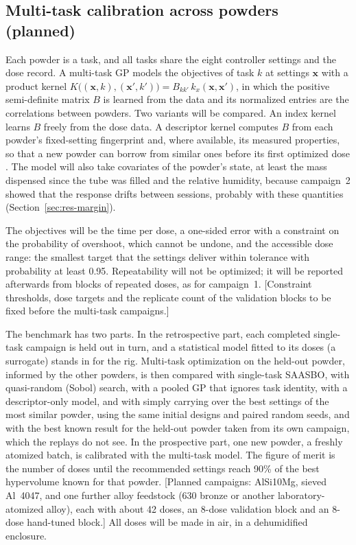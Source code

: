 \documentclass[preprint,12pt]{elsarticle}
\newcommand{\ph}[1]{\textcolor{orange!75!black}{\textsf{[#1]}}}
\begin{document}
\subsection{Multi-task calibration across powders (planned)}
\label{sec:mtbo}

Each powder is a task, and all tasks share the eight controller settings and the dose record. A multi-task GP \cite{Bonilla2008Multi,Swersky2013Multi} models the objectives of task $k$ at settings $\mathbf{x}$ with a product kernel $K\big((\mathbf{x},k),(\mathbf{x}',k')\big) = B_{kk'}\,k_x(\mathbf{x},\mathbf{x}')$, in which the positive semi-definite matrix $B$ is learned from the data and its normalized entries are the correlations between powders. Two variants will be compared. An index kernel learns $B$ freely from the dose data. A descriptor kernel computes $B$ from each powder's fixed-setting fingerprint and, where available, its measured properties, so that a new powder can borrow from similar ones before its first optimized dose \cite{Taylor2023Accelerated}. The model will also take covariates of the powder's state, at least the mass dispensed since the tube was filled and the relative humidity, because campaign~2 showed that the response drifts between sessions, probably with these quantities (Section~\ref{sec:res-margin}).

The objectives will be the time per dose, a one-sided error with a constraint on the probability of overshoot, which cannot be undone, and the accessible dose range: the smallest target that the settings deliver within tolerance with probability at least 0.95. Repeatability will not be optimized; it will be reported afterwards from blocks of repeated doses, as for campaign~1. \ph{Constraint thresholds, dose targets and the replicate count of the validation blocks to be fixed before the multi-task campaigns.}

The benchmark has two parts. In the retrospective part, each completed single-task campaign is held out in turn, and a statistical model fitted to its doses (a surrogate) stands in for the rig. Multi-task optimization on the held-out powder, informed by the other powders, is then compared with single-task SAASBO, with quasi-random (Sobol) search, with a pooled GP that ignores task identity, with a descriptor-only model, and with simply carrying over the best settings of the most similar powder, using the same initial designs and paired random seeds, and with the best known result for the held-out powder taken from its own campaign, which the replays do not see. In the prospective part, one new powder, a freshly atomized batch, is calibrated with the multi-task model. The figure of merit is the number of doses until the recommended settings reach 90\% of the best hypervolume known for that powder. \ph{Planned campaigns: AlSi10Mg, sieved Al~4047, and one further alloy feedstock (630 bronze or another laboratory-atomized alloy), each with about 42 doses, an 8-dose validation block and an 8-dose hand-tuned block.} All doses will be made in air, in a dehumidified enclosure.
\end{document}

